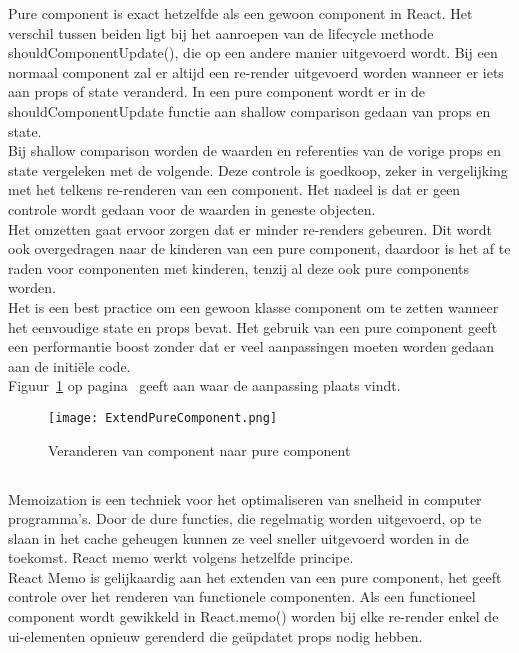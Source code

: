 Pure component is exact hetzelfde als een gewoon component in React. Het verschil tussen beiden ligt bij het aanroepen van de lifecycle methode shouldComponentUpdate(), die op een andere manier uitgevoerd wordt. Bij een normaal component zal er altijd een re-render uitgevoerd worden wanneer er iets aan props of state veranderd. In een pure component wordt er in de shouldComponentUpdate functie aan shallow comparison gedaan van props en state.\\
Bij shallow comparison worden de waarden en referenties van de vorige props en state vergeleken met de volgende. Deze controle is goedkoop, zeker in vergelijking met het telkens re-renderen van een component. Het nadeel is dat er geen controle wordt gedaan voor de waarden in geneste objecten. \\
Het omzetten gaat ervoor zorgen dat er minder re-renders gebeuren. Dit wordt ook overgedragen naar de kinderen van een pure component, daardoor is het af te raden voor componenten met kinderen, tenzij al deze ook pure components worden.\\
Het is een best practice om een gewoon klasse component om te zetten wanneer het eenvoudige state en props bevat. Het gebruik van een pure component geeft een performantie boost zonder dat er veel aanpassingen moeten worden gedaan aan de initiële code.\\
Figuur~\ref{fig:extendPureComponent} op pagina~\pageref{fig:extendPureComponent} geeft aan waar de aanpassing plaats vindt.

\begin{figure}[H]
    \texttt{[image: ExtendPureComponent.png]}
    \caption{Veranderen van component naar pure component}
    \label{fig:extendPureComponent}
\end{figure}


\subsection{}
\label{sec:memo}

Memoization is een techniek voor het optimaliseren van snelheid in computer programma's. Door de dure functies, die regelmatig worden uitgevoerd, op te slaan in het cache geheugen kunnen ze veel sneller uitgevoerd worden in de toekomst. React memo werkt volgens hetzelfde principe.\\
React Memo is gelijkaardig aan het extenden van een pure component, het geeft controle over het renderen van functionele componenten. Als een functioneel component wordt gewikkeld in React.memo() worden bij elke re-render enkel de \gls{ui}-elementen opnieuw gerenderd die geüpdatet props nodig hebben.

